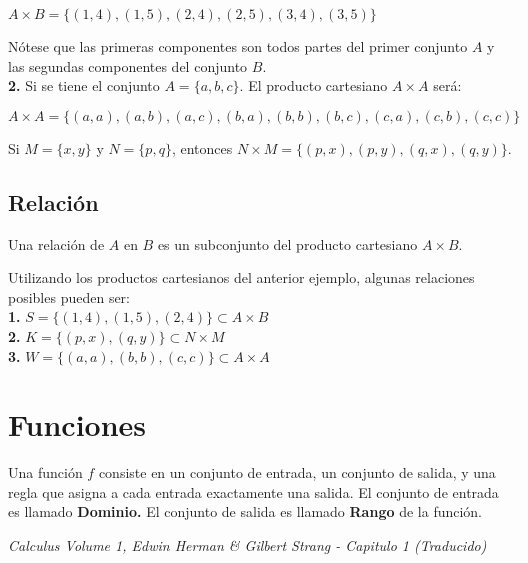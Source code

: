 \documentclass[12pt,a4paper]{book}
\newcommand*\ruleline[1]{\par\noindent\raisebox{.8ex}{\makebox[\linewidth]{\hrulefill\hspace{1ex}\raisebox{-.8ex}{#1}\hspace{1ex}\hrulefill}}}
\begin{document}
{{\begin{center}
$A \times B = \lbrace  (1,4),(1,5),(2,4),(2,5),(3,4),(3,5) \rbrace$
\end{center}
Nótese que las primeras componentes son todos partes del primer conjunto $A$ y las segundas componentes del conjunto $B$.\\${ }$\\
\textbf{2.} Si se tiene el conjunto $A=\lbrace a,b,c \rbrace$. El producto cartesiano $A \times A$ será:

\begin{center}
$A \times A = \lbrace  (a,a),(a,b),(a,c),(b,a),(b,b),(b,c),(c,a),(c,b),(c,c) \rbrace$
\end{center}

 Si $M=\lbrace x,y \rbrace$ y $N= \lbrace p,q \rbrace$, entonces $N \times M = \lbrace (p,x),(p,y),(q,x),(q,y) \rbrace$.


\subsection{Relación}
\begin{framed}\noindent
Una relación de $A$ en $B$ es un subconjunto del producto cartesiano $A \times B$.
\end{framed}
\ruleline{\textbf{Ejemplos}}
Utilizando los productos cartesianos del anterior ejemplo, algunas relaciones posibles pueden ser:\\${ }$\\
\textbf{1.} $S = \lbrace (1,4),(1,5),(2,4) \rbrace \subset A \times B$ \\${ }$\\
\textbf{2.} $K = \lbrace (p,x),(q,y) \rbrace \subset N \times M$\\${ }$\\
\textbf{3.} $W = \lbrace (a,a),(b,b),(c,c) \rbrace \subset A \times A$

\section{Funciones}
\begin{framed}\noindent
Una función $f$ consiste en un conjunto de entrada, un conjunto de salida, y una regla que asigna a cada entrada exactamente una salida. El conjunto de entrada es llamado \textbf{Dominio.} El conjunto de salida es llamado \textbf{Rango} de la función.
\begin{flushright}
\textit{{\scriptsize Calculus Volume 1, Edwin Herman \& Gilbert Strang - Capitulo 1 (Traducido)}}
\end{flushright}
\vspace{-0.5cm}
\end{framed}
}}
\end{document}
